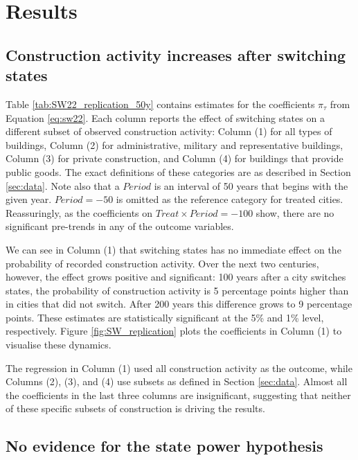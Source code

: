 \documentclass[11pt, a4paper]{article}
\begin{document}

\section{Results} \label{sec:results}

\subsection{Construction activity increases after switching states}

Table \ref{tab:SW22_replication_50y} contains estimates for the coefficients $\pi_\tau$ from Equation \eqref{eq:sw22}. Each column reports the effect of switching states on a different subset of observed construction activity: Column (1) for all types of buildings, Column (2) for administrative, military and representative buildings, Column (3) for private construction, and Column (4) for buildings that provide public goods. The exact definitions of these categories are as described in Section \ref{sec:data}. Note also that a $Period$ is an interval of 50 years that begins with the given year. $Period = -50$ is omitted as the reference category for treated cities. Reassuringly, as the coefficients on $Treat \times Period = -100$ show, there are no significant pre-trends in any of the outcome variables. 

We can see in Column (1) that switching states has no immediate effect on the probability of recorded construction activity. Over the next two centuries, however, the effect grows positive and significant: 100 years after a city switches states, the probability of construction activity is 5 percentage points higher than in cities that did not switch. After 200 years this difference grows to 9 percentage points. These estimates are statistically significant at the 5\% and 1\% level, respectively. Figure \ref{fig:SW_replication} plots the coefficients in Column (1) to visualise these dynamics.

The regression in Column (1) used all construction activity as the outcome, while Columns (2), (3), and (4) use subsets as defined in Section \ref{sec:data}. Almost all the coefficients in the last three columns are insignificant, suggesting that neither of these specific subsets of construction is driving the results. 


\subsection{No evidence for the state power hypothesis}
\end{document}
